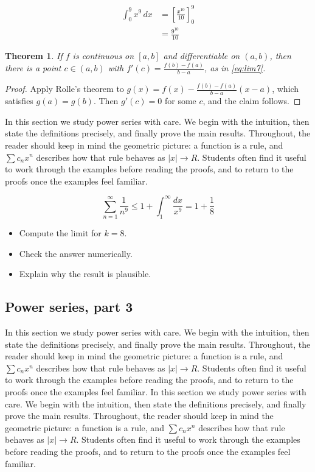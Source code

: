 \documentclass[11pt]{article}
\newtheorem{theorem}{Theorem}[section]
\begin{document}
\begin{align}
  \int_0^{9} x^{9}\,dx &= \left[ \frac{x^{10}}{10} \right]_0^{9} \\
  &= \frac{9^{10}}{10} \label{eq:int7}
\end{align}

\begin{theorem}
If $f$ is continuous on $[a,b]$ and differentiable on $(a,b)$, then there is a point $c \in (a,b)$ with $f'(c) = \frac{f(b)-f(a)}{b-a}$, as in \eqref{eq:lim7}.
\end{theorem}

\begin{proof}
Apply Rolle's theorem to $g(x) = f(x) - \frac{f(b)-f(a)}{b-a}(x-a)$, which satisfies $g(a) = g(b)$. Then $g'(c) = 0$ for some $c$, and the claim follows.
\end{proof}

In this section we study power series with care. We begin with the intuition, then state the definitions precisely, and finally prove the main results. Throughout, the reader should keep in mind the geometric picture: a function is a rule, and $\sum c_n x^n$ describes how that rule behaves as $|x| \to R$. Students often find it useful to work through the examples before reading the proofs, and to return to the proofs once the examples feel familiar. 

\[
  \sum_{n=1}^{\infty} \frac{1}{n^{9}} \le 1 + \int_1^{\infty} \frac{dx}{x^{9}} = 1 + \frac{1}{8}
\]

\begin{itemize}
  \item Compute the limit for $k = 8$.
  \item Check the answer numerically.
  \item Explain why the result is plausible.
\end{itemize}

\subsection{Power series, part 3}

In this section we study power series with care. We begin with the intuition, then state the definitions precisely, and finally prove the main results. Throughout, the reader should keep in mind the geometric picture: a function is a rule, and $\sum c_n x^n$ describes how that rule behaves as $|x| \to R$. Students often find it useful to work through the examples before reading the proofs, and to return to the proofs once the examples feel familiar. In this section we study power series with care. We begin with the intuition, then state the definitions precisely, and finally prove the main results. Throughout, the reader should keep in mind the geometric picture: a function is a rule, and $\sum c_n x^n$ describes how that rule behaves as $|x| \to R$. Students often find it useful to work through the examples before reading the proofs, and to return to the proofs once the examples feel familiar. 
\end{document}
